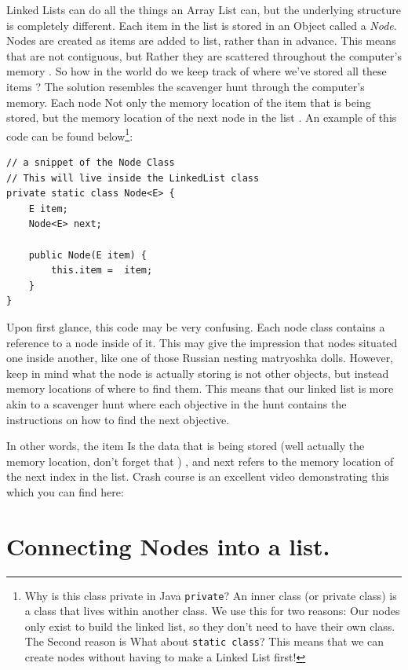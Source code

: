 \documentclass[10pt,a4paper]{book}
\begin{document}
Linked Lists can do all the things an Array List can, but the underlying structure is completely different.  
Each item in the list is stored in an Object called a \textit{Node}.  Nodes are created as items are added to list, rather than in advance.  This means that are not contiguous, but Rather they are scattered throughout the computer's memory . So how in the world do we keep track of where we've stored all these items ? The solution resembles the scavenger hunt through the computer's memory.  Each node Not only the memory location of the item that is being stored, but the memory location of the next node in the list . An example of this code can be found below\footnote{Why is this class private in Java \texttt{private}? An inner class  (or private class) is a class that lives within another class.  We use this for two reasons:  Our nodes only exist to build the linked list, so they don't need to have their own class.  The Second reason is   What about \texttt{static class}? This means that we can create nodes without having to make a Linked List first! }: %

\begin{verbatim}
// a snippet of the Node Class
// This will live inside the LinkedList class
private static class Node<E> {
	E item;
	Node<E> next;
	
	public Node(E item) {
		this.item =  item;
	}
} 
\end{verbatim}
Upon first glance, this code may be very confusing. Each node class contains a reference to a node inside of it.  This may give the impression that nodes  situated one inside another, like one of those Russian nesting matryoshka dolls.  
However, keep in mind what the node is actually storing is not other objects, but instead memory locations of where to find them.
This means that our linked list is more akin to a scavenger hunt where each objective in the hunt contains the instructions on how to find the next objective.

In other words, the item Is the data that is being stored (well actually the memory location, don't forget that ) , and next refers to the memory location of the next index in the list.  Crash course is an excellent video demonstrating this which you can find here: %


\section{Connecting Nodes into a list.}
\end{document}
